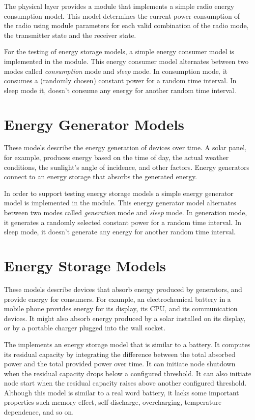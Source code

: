 The physical layer provides a  module that
implements a simple radio energy consumption model. This model determines the
current power consumption of the radio using module parameters for each valid
combination of the radio mode, the transmitter state and the receiver state.

For the testing of energy storage models, a simple energy consumer model
is implemented in the  module. This energy
consumer model alternates between two modes called \textit{consumption} mode
and \textit{sleep} mode. In consumption mode, it consumes a (randomly chosen)
constant power for a random time interval. In sleep mode it, doesn't consume
any energy for another random time interval.

\section{Energy Generator Models}

These models describe the energy generation of devices over time. A solar
panel, for example, produces energy based on the time of day, the actual
weather conditions, the sunlight's angle of incidence, and other factors.
Energy generators connect to an energy storage that absorbs the generated
energy.

In order to support testing energy storage models a simple energy generator
model is implemented in the  module.
This energy generator model alternates between two modes called
\textit{generation} mode and \textit{sleep} mode. In generation mode, it
generates a randomly selected constant power for a random time interval. In
sleep mode, it doesn't generate any energy for another random time
interval.

\section{Energy Storage Models}

These models describe devices that absorb energy produced by generators, and
provide energy for consumers. For example, an electrochemical battery in a
mobile phone provides energy for its display, its CPU, and its communication
devices. It might also absorb energy produced by a solar installed on its
display, or by a portable charger plugged into the wall socket.

The  implements an energy storage model that is
similar to a battery. It computes its residual capacity by integrating the
difference between the total absorbed power and the total provided power over
time. It can initiate node shutdown when the residual capacity drops below a
configured threshold. It can also initiate node start when the residual capacity
raises above another configured threshold. Although this model is similar to a
real word battery, it lacks some important properties such memory effect,
self-discharge, overcharging, temperature dependence, and so on.


